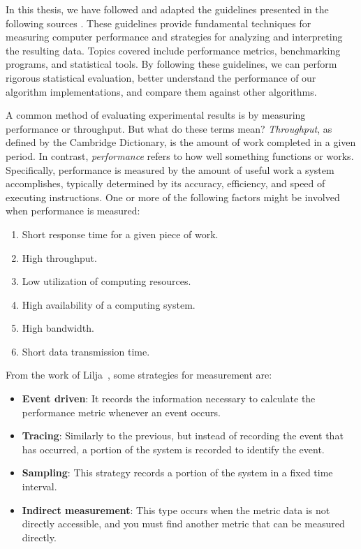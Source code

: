 In this thesis, we have followed and adapted the guidelines presented in the following sources \cite{forsyth2018probability, DBLP_conf_oopsla_GeorgesBE07,lilja2005measuring}. These guidelines provide fundamental techniques for measuring computer performance and strategies for analyzing and interpreting the resulting data. Topics covered include performance metrics, benchmarking programs, and statistical tools. By following these guidelines, we can perform rigorous statistical evaluation, better understand the performance of our algorithm implementations, and compare them against other algorithms.

A common method of evaluating experimental results is by measuring performance or throughput. But what do these terms mean? \emph{Throughput}, as defined by the Cambridge Dictionary, is the amount of work completed in a given period. In contrast, \emph{performance} refers to how well something functions or works. Specifically, performance is measured by the amount of useful work a system accomplishes, typically determined by its accuracy, efficiency, and speed of executing instructions. One or more of the following factors might be involved when performance is measured:

\begin{enumerate}
\item Short response time for a given piece of work.
\item High throughput.
\item Low utilization of computing resources.
\item High availability of a computing system.
\item High bandwidth.
\item Short data transmission time.
\end{enumerate}

From the work of Lilja~\cite{lilja2005measuring}, some strategies for measurement are:

\begin{itemize}
\item \textbf{Event driven}: It records the information necessary to calculate the
performance metric whenever an event occurs.
\item \textbf{Tracing}: Similarly to the previous, but instead of recording the event
that has occurred, a portion of the system is recorded to identify the event.
\item \textbf{Sampling}: This strategy records a portion of the system in a fixed time
interval.
\item \textbf{Indirect measurement}: This type occurs when the metric data is not
directly accessible, and you must find another metric that can be measured
directly.
\end{itemize}

